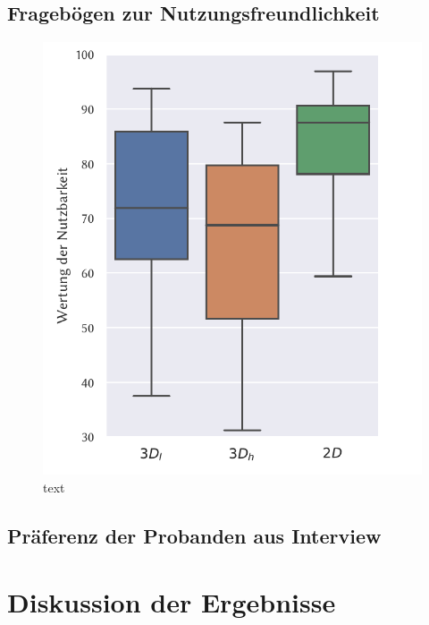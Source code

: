 \subsection{Fragebögen zur Nutzungsfreundlichkeit}

\begin{figure}
    \centering
    \includegraphics[width=\linewidth]{figures/analysis/usability}
    \caption{text}
    \label{fig:usability}
\end{figure}

\subsection{Präferenz der Probanden aus Interview}

\section{Diskussion der Ergebnisse}

%
\cleardoublepage
